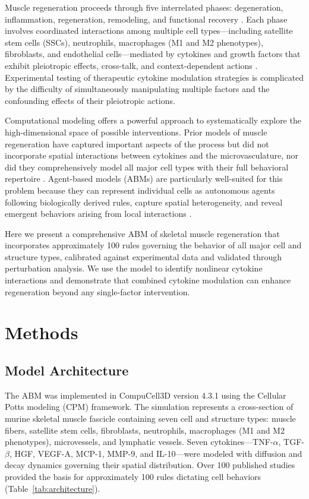 \documentclass[11pt]{article}
\begin{document}
Muscle regeneration proceeds through five interrelated phases: degeneration, inflammation, regeneration, remodeling, and functional recovery \citep{tidball2005inflammatory}. Each phase involves coordinated interactions among multiple cell types---including satellite stem cells (SSCs), neutrophils, macrophages (M1 and M2 phenotypes), fibroblasts, and endothelial cells---mediated by cytokines and growth factors that exhibit pleiotropic effects, cross-talk, and context-dependent actions \citep{chazaud2016inflammation}. Experimental testing of therapeutic cytokine modulation strategies is complicated by the difficulty of simultaneously manipulating multiple factors and the confounding effects of their pleiotropic actions.

Computational modeling offers a powerful approach to systematically explore the high-dimensional space of possible interventions. Prior models of muscle regeneration have captured important aspects of the process but did not incorporate spatial interactions between cytokines and the microvasculature, nor did they comprehensively model all major cell types with their full behavioral repertoire \citep{virgilio2018agent}. Agent-based models (ABMs) are particularly well-suited for this problem because they can represent individual cells as autonomous agents following biologically derived rules, capture spatial heterogeneity, and reveal emergent behaviors arising from local interactions \citep{an2017optimization}.

Here we present a comprehensive ABM of skeletal muscle regeneration that incorporates approximately 100 rules governing the behavior of all major cell and structure types, calibrated against experimental data and validated through perturbation analysis. We use the model to identify nonlinear cytokine interactions and demonstrate that combined cytokine modulation can enhance regeneration beyond any single-factor intervention.

\section{Methods}

\subsection{Model Architecture}

The ABM was implemented in CompuCell3D version 4.3.1 using the Cellular Potts modeling (CPM) framework. The simulation represents a cross-section of murine skeletal muscle fascicle containing seven cell and structure types: muscle fibers, satellite stem cells, fibroblasts, neutrophils, macrophages (M1 and M2 phenotypes), microvessels, and lymphatic vessels. Seven cytokines---TNF-$\alpha$, TGF-$\beta$, HGF, VEGF-A, MCP-1, MMP-9, and IL-10---were modeled with diffusion and decay dynamics governing their spatial distribution. Over 100 published studies provided the basis for approximately 100 rules dictating cell behaviors (Table~\ref{tab:architecture}).
\end{document}
